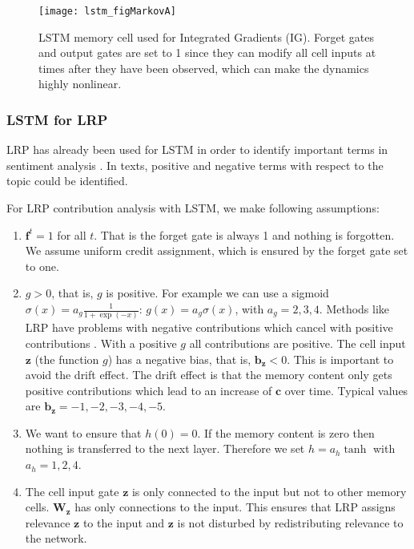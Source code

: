 \documentclass{article}
\newcommand\Bb{\bm{b}}
\newcommand\Bc{\bm{c}}
\newcommand\Bf{\bm{f}}
\newcommand\Bz{\bm{z}}
\newcommand\BW{\bm{W}}
\begin{document}
\begin{appendices}
\begin{figure}[htb]
\centering
\texttt{[image: lstm\_figMarkovA]}
\caption{LSTM memory cell used for Integrated Gradients (IG). 
  Forget gates and output gates are set to 1 since they
  can modify all cell inputs at times after they have been observed,
  which can make the dynamics highly nonlinear.
\label{fig:cellMarkovA}}
\end{figure}


\subsubsection{LSTM for LRP}

LRP has already been used for LSTM in order to
identify important terms in sentiment analysis \cite{Arras:17}.
In texts, positive and negative terms with respect to the topic
could be identified.

For LRP contribution analysis with LSTM, we make following assumptions:
\begin{enumerate}[label=\textbf{(A\arabic*)}]
\item $\Bf^t=1$ for all $t$. That is the forget gate is always 1 and
  nothing is forgotten. We assume uniform credit assignment, which
  is ensured by the forget gate set to one.

\item $g>0$, that is, $g$ is positive. For example we can use a sigmoid
  $\sigma(x)= a_g \frac{1}{1+\exp(-x)}$: $g(x)=a_g \sigma(x)$, with
  $a_g = 2,3,4$.
  Methods like LRP have problems with negative contributions
  which cancel with positive contributions \cite{Montavon:17}.
  With a positive $g$ all
  contributions are positive.
  The cell input $\Bz$ (the function $g$) has a negative bias, that is,
  $\Bb_{\Bz}<0$. This is important to avoid the drift effect.
  The drift effect is that the memory content only gets positive
  contributions which lead to an increase of $\Bc$ over time.
  Typical values are $\Bb_{\Bz} = -1,-2,-3,-4,-5$.

\item We want to ensure that $h(0)=0$. If the memory content is zero
  then nothing is transferred to the next layer.
  Therefore we set $h=a_h \tanh$ with $a_h=1,2,4$.

\item The cell input gate $\Bz$ is only connected to the input but not
  to other memory cells.  $\BW_{\Bz}$ has only connections to the
  input. This ensures
  that LRP assigns relevance $\Bz$ to the input and $\Bz$ is not
  disturbed by redistributing relevance to the network.


\end{enumerate}
\end{appendices}
\end{document}
